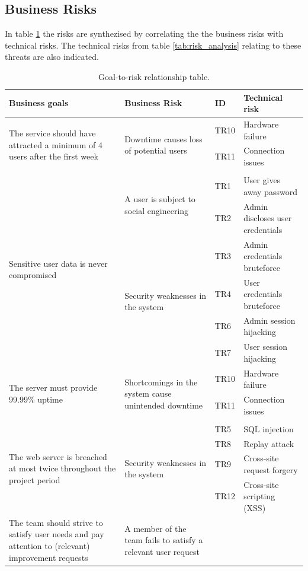 \documentclass[a4paper]{article}
\begin{document}
\subsection{Business Risks}
In table \ref{tab:goal_to_risk_relationship} the risks are synthezised by correlating the the business risks with technical risks. The technical risks from table \ref{tab:risk_analysis} relating to these threats are also indicated.

\begin{table}[h!]
	\begin{tabular}{| p{4cm} | p{4cm}| l | l |}
    \hline
   	\textbf{Business goals} & \textbf{Business Risk} & \textbf{ID}  & \textbf{Technical risk} \\ \hline
    \multirow{3}{4cm}{The service should have attracted a minimum of 4 users after the first week} & \multirow{3}{4cm}{Downtime causes loss of potential users} & TR10 & Hardware failure \\ & & TR11 & Connection issues \\ & & & \\ \hline
    \multirow{6}{4cm}{Sensitive user data is never compromised} & \multirow{2}{4cm}{A user is subject to social engineering} & TR1 & User gives away password \\ & & TR2 & Admin discloses user credentials \\ & \multirow{4}{4cm}{Security weaknesses in the system} & TR3 & Admin credentials bruteforce \\ & & TR4 & User credentials bruteforce \\ & & TR6 & Admin session hijacking \\ & & TR7 & User session hijacking \\ \hline
    \multirow{3}{4cm}{The server must provide 99.99\% uptime} & \multirow{3}{4cm}{Shortcomings in the system cause unintended downtime} & TR10 & Hardware failure \\ & & TR11 & Connection issues \\ & & & \\ \hline
    \multirow{4}{4cm}{The web server is breached at most twice throughout the project period} & \multirow{4}{4cm}{Security weaknesses in the system} & TR5 & SQL injection \\ & & TR8 & Replay attack \\ & & TR9 & Cross-site request forgery \\ & & TR12 & Cross-site scripting (XSS) \\ \hline
    The team should strive to satisfy user needs and pay attention to (relevant) improvement requests & A member of the team fails to satisfy a relevant user request & & \\ \hline
    \end{tabular}
    \caption{Goal-to-risk relationship table.}
	\label{tab:goal_to_risk_relationship}
\end{table}
\end{document}
